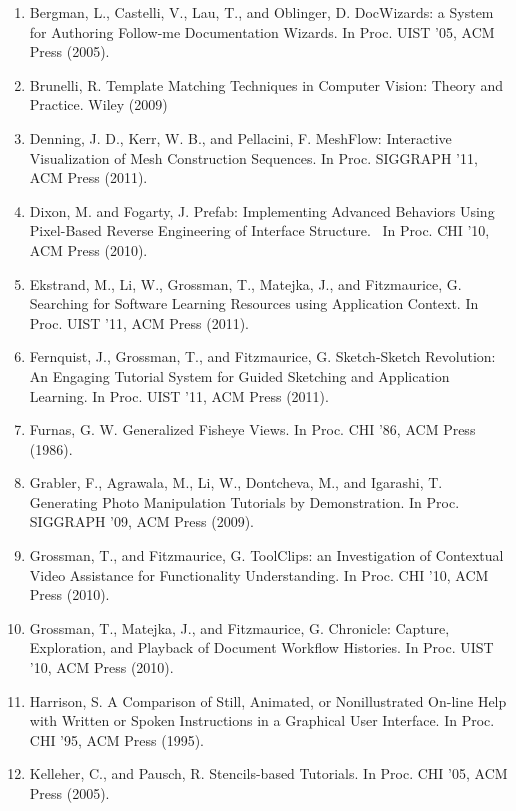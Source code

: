 \begin{enumerate}
\item \label{bkm:Ref195895513}Bergman, L., Castelli, V., Lau, T., and Oblinger, D. DocWizards: a System for Authoring Follow-me Documentation Wizards. In Proc. UIST '05, ACM Press (2005).
\item Brunelli, R. Template Matching Techniques in Computer Vision: Theory and Practice. Wiley (2009)
\item \label{bkm:Ref195952943}Denning, J. D., Kerr, W. B., and Pellacini, F. MeshFlow: Interactive Visualization of Mesh Construction Sequences. In Proc. SIGGRAPH '11, ACM Press (2011).
\item \label{bkm:Ref202759509}Dixon, M. and Fogarty, J. Prefab: Implementing Advanced Behaviors Using Pixel-Based Reverse Engineering of Interface Structure. \ In Proc. CHI '10, ACM Press (2010).
\item \label{bkm:Ref184382380}Ekstrand, M., Li, W., Grossman, T., Matejka, J., and Fitzmaurice, G. Searching for Software Learning Resources using Application Context. In Proc. UIST '11, ACM Press (2011).
\item \label{bkm:Ref184382416}Fernquist, J., Grossman, T., and Fitzmaurice, G. Sketch-Sketch Revolution: An Engaging Tutorial System for Guided Sketching and Application Learning. In Proc. UIST '11, ACM Press (2011).
\item \label{bkm:Ref195903406}Furnas, G. W. Generalized Fisheye Views. In Proc. CHI '86, ACM Press (1986).
\item \label{bkm:Ref184382310}Grabler, F., Agrawala, M., Li, W., Dontcheva, M., and Igarashi, T. Generating Photo Manipulation Tutorials by Demonstration. In Proc. SIGGRAPH '09, ACM Press (2009).
\item \label{bkm:Ref184382395}Grossman, T., and Fitzmaurice, G. ToolClips: an Investigation of Contextual Video Assistance for Functionality Understanding. In Proc. CHI '10, ACM Press (2010).
\item \label{bkm:Ref201634303}Grossman, T., Matejka, J., and Fitzmaurice, G. Chronicle: Capture, Exploration, and Playback of Document Workflow Histories. In Proc. UIST '10, ACM Press (2010).
\item \label{bkm:Ref195895340}Harrison, S. A Comparison of Still, Animated, or Nonillustrated On-line Help with Written or Spoken Instructions in a Graphical User Interface. In Proc. CHI '95, ACM Press (1995).
\item \label{bkm:Ref184382347}Kelleher, C., and Pausch, R. Stencils-based Tutorials. In Proc. CHI '05, ACM Press (2005).

\end{enumerate}
